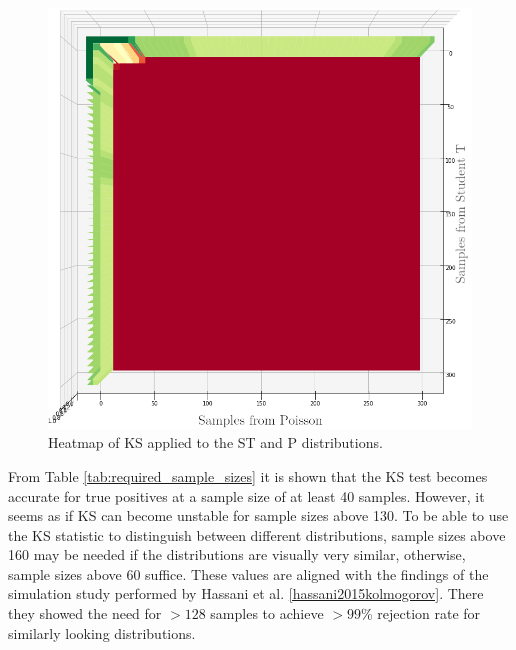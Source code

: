 \begin{figure}[h]
  \centering
  \includegraphics[width=\linewidth]{./img/hypothesis_test/deepar_heatmap_Y_student_t_X_poisson_ks_edited.png}
  \endminipage
  \caption{Heatmap of KS applied to the ST and P distributions.}
  \label{ks_student_t_poisson}
\end{figure}
\clearpage

From Table \ref{tab:required_sample_sizes} it is shown that the KS test becomes accurate for true positives at a sample size of at least 40 samples. However, it seems as if KS can become unstable for sample sizes above 130. To be able to use the KS statistic to distinguish between different distributions, sample sizes above 160 may be needed if the distributions are visually very similar, otherwise, sample sizes above \(60\) suffice. These values are aligned with the findings of the simulation study performed by Hassani et al. \ref{hassani2015kolmogorov}. There they showed the need for \(>128\) samples to achieve \(>99\)\% rejection rate for similarly looking distributions.

